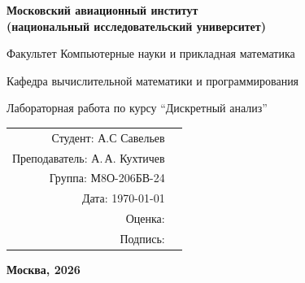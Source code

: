 \begin{titlepage}
\begin{center}
\bfseries
{\Large Московский авиационный институт\\ (национальный исследовательский университет)}

\vspace{48pt}
{\large Факультет Компьютерные науки и прикладная математика}

\vspace{36pt}
{\large Кафедра вычислительной математики и программирования}

\vspace{48pt}
Лабораторная работа  по курсу \enquote{Дискретный анализ}
\end{center}

\vspace{72pt}
\begin{flushright}
\begin{tabular}{rl}
Студент: А.С Савельев \\
Преподаватель: А.\,А. Кухтичев& \\
Группа: М8О-206БВ-24& \\
Дата: \today& \\
Оценка: & \\
Подпись: & \\
\end{tabular}
\end{flushright}

\vfill
\begin{center}
\bfseries
Москва, 2026
\end{center}
\end{titlepage}

\pagebreak
